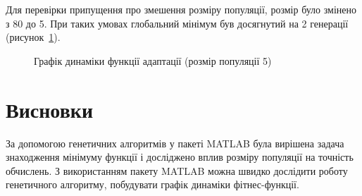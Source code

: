 Для перевірки припущення про змешення розміру популяції, розмір було змінено з 80 до 5. При таких умовах глобальний мінімум був досягнутий на 2 генерації (рисунок~\ref{fig:plot_dynamic_2}). 

\begin{figure}[H]
  \centering
{}
  \captionsetup{justification=centering}
  \caption{Графік динаміки функції адаптації (розмір популяції 5)}
  \label{fig:plot_dynamic_2}
\end{figure}

%
%
\section*{Висновки} 
За допомогою генетичних алгоритмів у пакеті MATLAB була вирішена задача знаходження мінімуму функції і досліджено вплив  розміру популяції на точність обчислень. З використанням пакету MATLAB можна швидко дослідити роботу генетичного алгоритму, побудувати графік динаміки фітнес-функції. 
